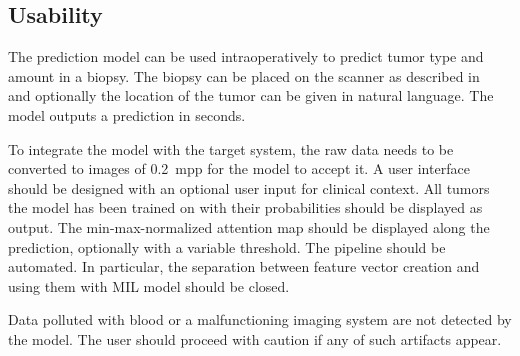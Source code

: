 \subsection{Usability}
The prediction model can be used intraoperatively to predict tumor type and amount in a biopsy.
The biopsy can be placed on the scanner as described in~ and optionally the location of the tumor can be given in natural language.
The model outputs a prediction in seconds.

To integrate the model with the target system, the raw data needs to be converted to images of \qty{0.2}{mpp} for the model to accept it.
A user interface should be designed with an optional user input for clinical context.
All tumors the model has been trained on with their probabilities should be displayed as output.
The min-max-normalized attention map should be displayed along the prediction, optionally with a variable threshold.
The pipeline should be automated.
In particular, the separation between feature vector creation and using them with MIL model should be closed.

Data polluted with blood or a malfunctioning imaging system are not detected by the model.
The user should proceed with caution if any of such artifacts appear.
